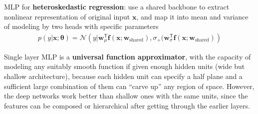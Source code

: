 MLP for \textbf{heteroskedastic regression}: 
use a shared backbone to extract nonlinear representation of original input $\bm{x}$,
and map it into mean and variance of modeling by two heads with specific parameters%
\begin{gather}
    p(y|\bm{x};\bm{\theta})
    = \mathcal{N}\left(
        y|\bm{w}_\mu^\mathsf{T}\bm{f}(\bm{x};\bm{w}_\text{shared}),
        \sigma_+(\bm{w}_\sigma^\mathsf{T}\bm{f}(\bm{x};\bm{w}_\text{shared})
    \right)\label{eq:heteroreg}
\end{gather}

Single layer MLP is a \textbf{universal function approximator}, 
with the capacity of modeling any suitably smooth function 
if given enough hidden units (wide but shallow architecture),
because each hidden unit can specify a half plane 
and a sufficient large combination of them can ``carve up'' any region of space.
However, the deep networks work better than shallow ones with the same units, 
since the features can be composed or hierarchical after getting through the earlier layers.

